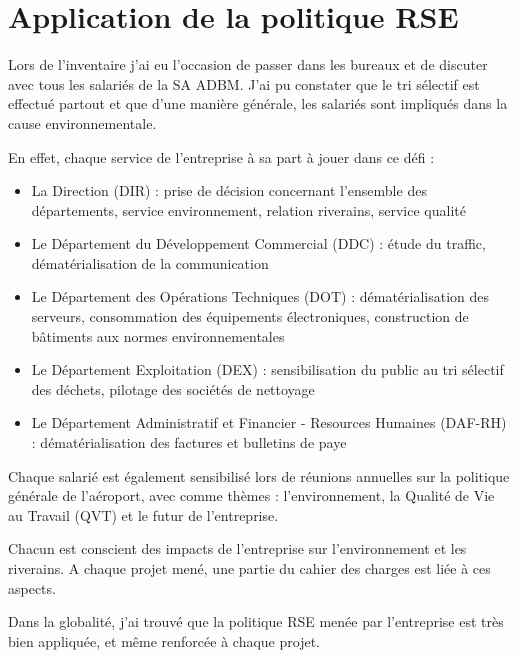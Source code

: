\section{Application de la politique RSE}

Lors de l'inventaire j'ai eu l'occasion de passer dans les bureaux et de discuter avec tous les salariés de la SA ADBM. J'ai pu constater que le tri sélectif est effectué partout et que d'une manière générale, les salariés sont impliqués dans la cause environnementale.\newline

En effet, chaque service de l'entreprise à sa part à jouer dans ce défi :

\begin{itemize}
    \item La Direction (DIR) : prise de décision concernant l'ensemble des départements, service environnement, relation riverains, service qualité
    \item Le Département du Développement Commercial (DDC) : étude du traffic, dématérialisation de la communication
    \item Le Département des Opérations Techniques (DOT) : dématérialisation des serveurs, consommation des équipements électroniques, construction de bâtiments aux normes environnementales
    \item Le Département Exploitation (DEX) : sensibilisation du public au tri sélectif des déchets, pilotage des sociétés de nettoyage
    \item Le Département Administratif et Financier - Resources Humaines (DAF-RH) : dématérialisation des factures et bulletins de paye\newline
\end{itemize}

Chaque salarié est également sensibilisé lors de réunions annuelles sur la politique générale de l'aéroport, avec comme thèmes : l'environnement, la Qualité de Vie au Travail (QVT) et le futur de l'entreprise.

Chacun est conscient des impacts de l'entreprise sur l'environnement et les riverains. A chaque projet mené, une partie du cahier des charges est liée à ces aspects.\newline

Dans la globalité, j’ai trouvé que la politique RSE menée par l’entreprise est très bien appliquée, et même renforcée à chaque projet.
